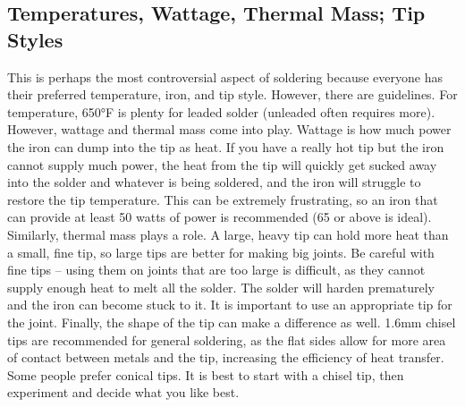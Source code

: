 \subsection{Temperatures, Wattage, Thermal Mass; Tip Styles}
This is perhaps the most controversial aspect of soldering because everyone has their preferred temperature, iron, and tip style. However, there are guidelines. For temperature, 650°F is plenty for leaded solder (unleaded often requires more). However, wattage and thermal mass come into play. Wattage is how much power the iron can dump into the tip as heat. If you have a really hot tip but the iron cannot supply much power, the heat from the tip will quickly get sucked away into the solder and whatever is being soldered, and the iron will struggle to restore the tip temperature. This can be extremely frustrating, so an iron that can provide at least 50 watts of power is recommended (65 or above is ideal). Similarly, thermal mass plays a role. A large, heavy tip can hold more heat than a small, fine tip, so large tips are better for making big joints. Be careful with fine tips – using them on joints that are too large is difficult, as they cannot supply enough heat to melt all the solder. The solder will harden prematurely and the iron can become stuck to it. It is important to use an appropriate tip for the joint. Finally, the shape of the tip can make a difference as well. 1.6mm chisel tips are recommended for general soldering, as the flat sides allow for more area of contact between metals and the tip, increasing the efficiency of heat transfer. Some people prefer conical tips. It is best to start with a chisel tip, then experiment and decide what you like best.
